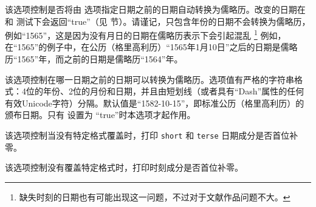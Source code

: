 \begin{optionlist}
该选项控制是否将由  选项指定日期之前的日期自动转换为儒略历。改变的日期在  和  测试下会返回“true”（见  节）。请谨记，只包含年份的日期不会转换为儒略历，例如“1565”，这是因为没有月日的日期在儒略历表示下会引起混乱
\footnote{缺失时刻的日期也有可能出现这一问题，不过对于文献作品问题不大。}
例如，在“1565”的例子中，在公历（格里高利历）“1565年1月10日”之后的日期是儒略历“1565”年，而之前的日期是儒略历“1564”年。


该选项控制在哪一日期之前的日期可以转换为儒略历。选项值有严格的字符串格式：4位的年份、2位的月份和日期，并且由短划线（或者具有“Dash”属性的任何有效Unicode字符）分隔。默认值是“1582-10-15”，即标准公历（格里高利历）的颁布日期。只有  设置为 “true”时本选项才起作用。


该选项控制当没有特定格式覆盖时，打印 \texttt{short} 和 \texttt{terse} 日期成分是否首位补零。


该选项控制没有覆盖特定格式时，打印时刻成分是否首位补零。


\end{optionlist}
